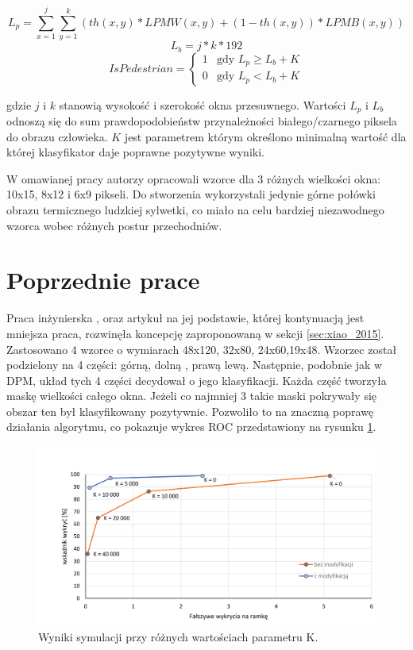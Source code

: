 \begin{equation}\label{equ:Lp}
L_{p} = \sum_{x=1}^{j}\sum_{y=1}^{k}(th(x,y)*LPMW(x,y)+(1-th(x,y))*LPMB(x,y))
\end{equation}
\begin{equation}\label{equ:Lb}
L_{b} = j*k*192
\end{equation}
\begin{equation} \label{equ:ispedistant}
IsPedestrian = \left\{ \begin{array}{ll}
1 & \textrm{gdy $L_{p} \geq L_{b} + K$}\\
0 & \textrm{gdy $L_{p}<L_{b} + K$}
\end{array} \right.
\end{equation}

\noindent gdzie $j$ i $k$ stanowią wysokość i szerokość okna przesuwnego. Wartości $L_p$ i $L_b$ odnoszą się do sum prawdopodobieństw przynależności białego/czarnego piksela do obrazu człowieka. $K$ jest parametrem którym określono minimalną wartość dla której klasyfikator daje poprawne pozytywne wyniki.

W omawianej pracy autorzy opracowali wzorce dla 3 różnych wielkości okna: 10x15, 8x12 i 6x9 pikseli. Do stworzenia wykorzystali jedynie górne połówki obrazu termicznego ludzkiej sylwetki, co miało na celu bardziej niezawodnego wzorca wobec różnych postur przechodniów. 
\section{Poprzednie prace}
Praca inżynierska \cite{kankaing}, oraz artykuł na jej podstawie\cite{kanka2016fpga}, której kontynuacją jest mniejsza praca, rozwinęła koncepcję zaproponowaną w sekcji \ref{sec:xiao_2015}. Zastosowano 4 wzorce o wymiarach 48x120, 32x80, 24x60,19x48. Wzorzec został podzielony na 4 części: górną, dolną , prawą lewą. Następnie, podobnie jak w DPM, układ tych 4 części decydował o jego klasyfikacji. Każda część tworzyła maskę wielkości całego okna. Jeżeli co najmniej 3 takie maski pokrywały się obszar ten był klasyfikowany pozytywnie. Pozwoliło to na znaczną poprawę działania algorytmu, co pokazuje wykres ROC przedstawiony na rysunku \ref{fig:analiza_wykres}. 

	\begin{figure}
	\centering
	\includegraphics[width=0.8\linewidth]{images/Analiza_wykres}
	\caption[Wykres REC]{Wyniki symulacji przy różnych wartościach parametru K.}
	\label{fig:analiza_wykres}
	\end{figure}

